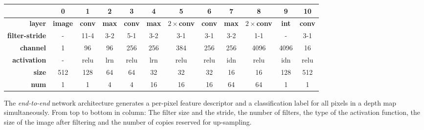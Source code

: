 \documentclass[10pt,twocolumn,letterpaper]{article}
\begin{document}
\begin{tabular}{rccccccccccc}
\hline
\textbf{}              & 0              & 1             & 2            & 3             & 4            & 5               & 6             & 7            & 8               & 9            & 10            \\ \hline
\textbf{layer}         & \textbf{image} & \textbf{conv} & \textbf{max} & \textbf{conv} & \textbf{max} & \textbf{$2\times$conv} & \textbf{conv} & \textbf{max} & \textbf{$2\times$conv} & \textbf{int} & \textbf{conv} \\
\textbf{filter-stride} & -              & 11-4          & 3-2          &       5-1        & 3-2          & 3-1             & 3-1           & 3-2          & 1-1             & -            & 3-1           \\
\textbf{channel}       & 1              & 96            & 96           & 256           & 256          & 384             & 256           & 256          & 4096            & 4096         & 16            \\
\textbf{activation}    & -              & relu          & lrn          & relu          & lrn          & relu            & relu          & idn          & relu            & idn          & relu          \\
\textbf{size}          & 512            & 128           & 64           & 64            & 32           & 32              & 32            & 16           & 16              & 128          & 512           \\
\textbf{num}           & 1              & 1             & 4            & 4             & 16           & 16              & 16            & 64           & 64              & 1            & 1             \\ \hline
\end{tabular}
\caption{The \emph{end-to-end} network architecture generates a per-pixel feature descriptor and a classification label for all pixels in a depth map simultaneously. From top to bottom in column: The filter size and the stride, the number of filters, the type of the activation function, the size of the image after filtering and the number of copies reserved for up-sampling.}
\label{table:end-to-end}
\end{document}
